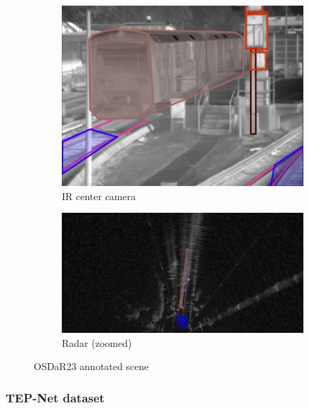 \begin{figure}[H]
\begin{subfigure}{0.24\textwidth}
        \includegraphics[width=\textwidth]{PICs/datasets/OSDaR23_dataset/labeled_IR.png}
        \caption{IR center camera}
    \end{subfigure}%
    \hfill
    \begin{subfigure}{0.24\textwidth}
        \centering
        \includegraphics[width=\textwidth]{PICs/datasets/OSDaR23_dataset/labeled_Radar.png}
        \caption{Radar (zoomed)}
    \end{subfigure}
    
    \caption{OSDaR23 annotated scene \cite{oSDaR23}}
    \label{fig:OSDaR23_annotated}
\end{figure}


\subsubsection{TEP-Net dataset}
\label{subsubsec:TEP-Net_dataset}

